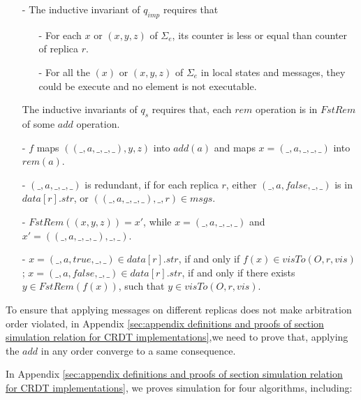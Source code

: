 \begin{itemize}
\setlength{\itemsep}{0.5pt}
\item[-] The inductive invariant of $q_{\mathit{imp}}$ requires that 

    \begin{itemize}
    \setlength{\itemsep}{0.5pt}
    \item[-] For each $x$ or $(x,y,z)$ of $\Sigma_e$, its counter is less or equal than counter of replica $r$.

    \item[-] For all the $(x)$ or $(x,y,z)$ of $\Sigma_e$ in local states and messages, they could be execute and no element is not executable.
    \end{itemize}

    The inductive invariants of $q_s$ requires that, each $rem$ operation is in $\mathit{FstRem}$ of some $add$ operation. 

\item[-] $f$ maps $((\_,a,\_,\_,\_),y,z)$ into $add(a)$ and maps $x = (\_,a,\_,\_,\_)$ into $rem(a)$.  

\item[-] $(\_,a,\_,\_,\_)$ is redundant, if for each replica $r$, either $(\_,a,\mathit{false},\_,\_)$ is in $data[r].str$, or $((\_,a,\_,\_,\_),\_,r) \in msgs$. 

\item[-] $\mathit{FstRem}((x,y,z)) = x'$, while $x=(\_,a,\_,\_,\_)$ and $x' = ((\_,a,\_,\_,\_),\_,\_)$. 

\item[-] $x = (\_,a,\mathit{true},\_,\_) \in data[r].str$, if and only if $f(x) \in visTo(O,r,\mathit{vis})$; $x = (\_,a,\mathit{false},\_,\_) \in data[r].str$, if and only if there exists $y \in \mathit{FstRem}(f(x))$, such that $y \in visTo(O,r,\mathit{vis})$. 
\end{itemize}

To ensure that applying messages on different replicas does not make arbitration order violated, in Appendix \ref{sec:appendix definitions and proofs of section simulation relation for CRDT implementations},we need to prove that, applying the $add$ in any order converge to a same consequence. 

In Appendix \ref{sec:appendix definitions and proofs of section simulation relation for CRDT implementations}, we proves simulation for four algorithms, including:

